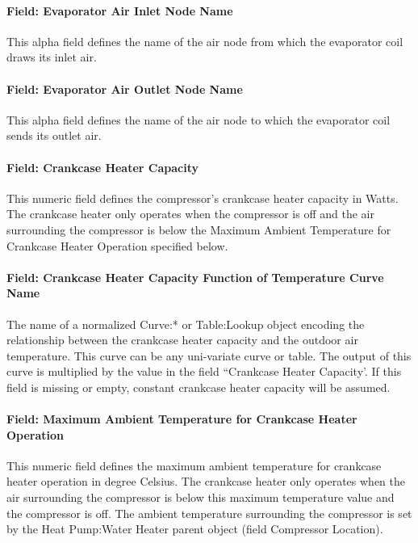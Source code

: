 \paragraph{Field: Evaporator Air Inlet Node Name}\label{field-evaporator-air-inlet-node-name-2}

This alpha field defines the name of the air node from which the evaporator coil draws its inlet air.

\paragraph{Field: Evaporator Air Outlet Node Name}\label{field-evaporator-air-outlet-node-name-1}

This alpha field defines the name of the air node to which the evaporator coil sends its outlet air.

\paragraph{Field: Crankcase Heater Capacity}\label{field-crankcase-heater-capacity-8}

This numeric field defines the compressor's crankcase heater capacity in Watts. The crankcase heater only operates when the compressor is off and the air surrounding the compressor is below the Maximum Ambient Temperature for Crankcase Heater Operation specified below.

\paragraph{Field: Crankcase Heater Capacity Function of Temperature Curve Name}

The name of a normalized Curve:* or Table:Lookup object encoding the relationship between the crankcase heater capacity and the outdoor air temperature. This curve can be any uni-variate curve or table. The output of this curve is multiplied by the value in the field ``Crankcase Heater Capacity'. If this field is missing or empty, constant crankcase heater capacity will be
assumed.

\paragraph{Field: Maximum Ambient Temperature for Crankcase Heater Operation}\label{field-maximum-ambient-temperature-for-crankcase-heater-operation-1}

This numeric field defines the maximum ambient temperature for crankcase heater operation in degree Celsius. The crankcase heater only operates when the air surrounding the compressor is below this maximum temperature value and the compressor is off. The ambient temperature surrounding the compressor is set by the Heat Pump:Water Heater parent object (field Compressor Location).

